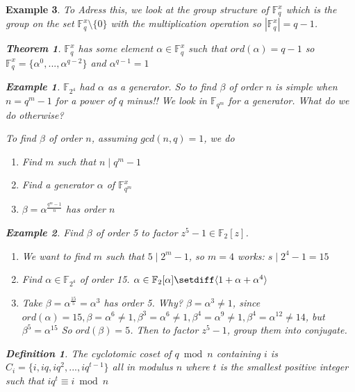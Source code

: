 \documentclass{article}
\newtheorem{thm}{Theorem}
\newtheorem{defn}{Definition}
\newtheorem{eg}{Example}
\begin{document}
\begin{eg}
To Adress this, we look at the group structure of $\mathbb{F}_q^x$ which is the
group on the set $\mathbb{F}_q^x\setminus\{0\}$ with the multiplication operation
so $|\mathbb{F}_q^x| = q-1$.

\begin{thm}
    $\mathbb{F}_q^x$ has some element $\alpha\in\mathbb{F}^x_q$ such that
    $ord(\alpha) = q-1$ so $\mathbb{F}_q^x = \{\alpha^0,...,\alpha^{q-2}\}$ and
    $\alpha^{q-1} = 1$
\end{thm}

\begin{eg}
    $\mathbb{F}_{2^4}$ had $\alpha$ as a generator. So to find $\beta$ of order $n$
    is simple when $n=q^m-1$ for a power of $q$ minus!! We look in $\mathbb{F}_{q^m}$
    for a generator. What do we do otherwise?

    To find $\beta$ of order $n$, assuming $gcd(n, q) = 1$, we do
    \begin{enumerate}
        \item Find $m$ such that $n\mid q^m-1$
        \item Find a generator $\alpha$ of $\mathbb{F}^x_{q^m}$
        \item $\beta = \alpha^{\frac{q^m-1}{n}}$ has order $n$
    \end{enumerate}
\end{eg}

\begin{eg}
    Find $\beta$ of order 5 to factor $z^5-1\in\mathbb{F}_2[z]$.
    \begin{enumerate}
        \item We want to find $m$ such that $5\mid 2^m -1$, so
            $m=4$ works: $s\mid 2^4-1  = 15$
        \item Find $\alpha\in\mathbb{F}_{2^4}$ of order 15.
            $\alpha\in\mathbb{F}_2[\alpha]\setdiff\langle
            1+\alpha+\alpha^4\rangle$
        \item Take $\beta = \alpha^{\frac{15}{5}} = \alpha^3$
            has order 5. Why? $\beta = \alpha^3 \ne 1$, since
            $ord(\alpha) = 15, \beta = \alpha^6 \ne 1,
            \beta^3 = \alpha^6\ne 1, \beta^4 = \alpha^9\ne 1,
            \beta^4 = \alpha^{12} \ne 14$, but $\beta^5 = \alpha^{15}$
            So $ord(\beta) = 5$. Then to factor $z^5 - 1$, group them
            into conjugate.
    \end{enumerate}
\end{eg}

\begin{defn}
    The cyclotomic coset of $q\bmod{n}$ containing $i$ is
    $C_i = \{i, iq, iq^2, ..., iq^{t-1}\}$ all in modulus $n$
    where $t$ is the smallest positive integer such that
    $iq^t\equiv i\bmod{n}$
\end{defn}


\end{eg}
\end{document}
